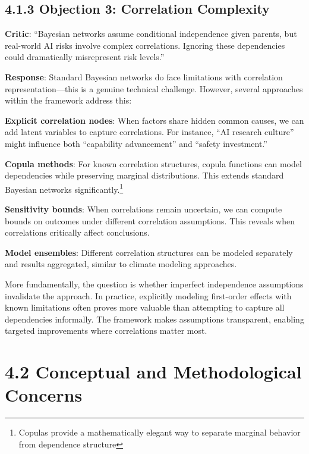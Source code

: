 \documentclass[
  11pt,
  letterpaper,
]{book}
\begin{document}
\subsection*{4.1.3 Objection 3: Correlation
Complexity}\label{sec-correlation-complexity}

\textbf{Critic}: ``Bayesian networks assume conditional independence
given parents, but real-world AI risks involve complex correlations.
Ignoring these dependencies could dramatically misrepresent risk
levels.''

\textbf{Response}: Standard Bayesian networks do face limitations with
correlation representation---this is a genuine technical challenge.
However, several approaches within the framework address this:

\textbf{Explicit correlation nodes}: When factors share hidden common
causes, we can add latent variables to capture correlations. For
instance, ``AI research culture'' might influence both ``capability
advancement'' and ``safety investment.''

\textbf{Copula methods}: For known correlation structures, copula
functions can model dependencies while preserving marginal
distributions. This extends standard Bayesian networks
significantly.\footnote{Copulas provide a mathematically elegant way to
  separate marginal behavior from dependence structure}

\textbf{Sensitivity bounds}: When correlations remain uncertain, we can
compute bounds on outcomes under different correlation assumptions. This
reveals when correlations critically affect conclusions.

\textbf{Model ensembles}: Different correlation structures can be
modeled separately and results aggregated, similar to climate modeling
approaches.

More fundamentally, the question is whether imperfect independence
assumptions invalidate the approach. In practice, explicitly modeling
first-order effects with known limitations often proves more valuable
than attempting to capture all dependencies informally. The framework
makes assumptions transparent, enabling targeted improvements where
correlations matter most.

\section*{4.2 Conceptual and Methodological
Concerns}\label{sec-conceptual-concerns}
\end{document}
